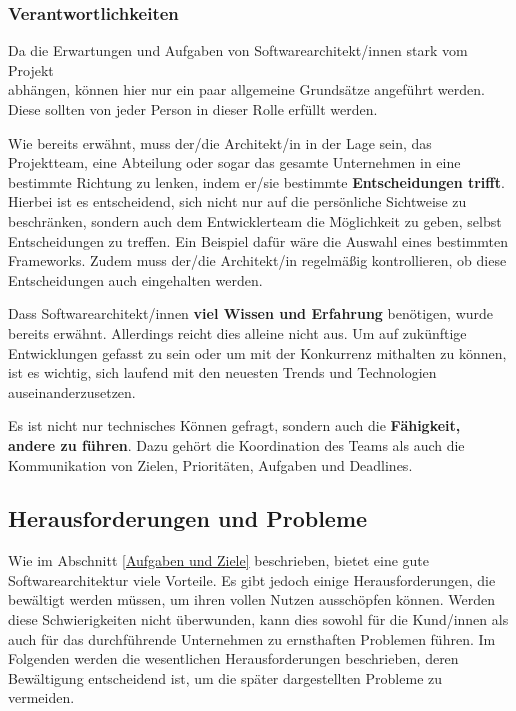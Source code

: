     \subsubsection{Verantwortlichkeiten}

    Da die Erwartungen und Aufgaben von Softwarearchitekt/innen stark vom Projekt \\ abhängen, können hier nur ein paar allgemeine Grundsätze angeführt werden. \\ Diese sollten von jeder Person in dieser Rolle erfüllt werden.

    Wie bereits erwähnt, muss der/die Architekt/in in der Lage sein, das Projektteam, eine Abteilung oder sogar das gesamte Unternehmen in eine bestimmte Richtung zu lenken, indem er/sie bestimmte \textbf{Entscheidungen trifft}. Hierbei ist es entscheidend, sich nicht nur auf die persönliche Sichtweise zu beschränken, sondern auch dem Entwicklerteam die Möglichkeit zu geben, selbst Entscheidungen zu treffen. Ein Beispiel dafür wäre die Auswahl eines bestimmten Frameworks. Zudem muss der/die Architekt/in regelmäßig kontrollieren, ob diese Entscheidungen auch eingehalten werden. 

    Dass Softwarearchitekt/innen \textbf{viel Wissen und Erfahrung} benötigen, wurde bereits erwähnt. Allerdings reicht dies alleine nicht aus. 
    Um auf zukünftige Entwicklungen gefasst zu sein oder um mit der Konkurrenz mithalten zu können, ist es wichtig, sich laufend mit den neuesten Trends und Technologien auseinanderzusetzen.

    Es ist nicht nur technisches Können gefragt, sondern auch die \textbf{Fähigkeit, andere zu führen}. Dazu gehört die Koordination des Teams als auch die Kommunikation von Zielen, Prioritäten, Aufgaben und Deadlines.
    \cite[S. 7-8]{EA:Book02} \cite{EA:Web03}



\subsection{Herausforderungen und Probleme} \label{Herausforderungen und Probleme}

Wie im Abschnitt \ref{Aufgaben und Ziele} beschrieben, bietet eine gute Softwarearchitektur viele Vorteile. Es gibt jedoch einige Herausforderungen, die bewältigt werden müssen, um ihren vollen Nutzen ausschöpfen können. 
Werden diese Schwierigkeiten nicht überwunden, kann dies sowohl für die Kund/innen als auch für das durchführende Unternehmen zu ernsthaften Problemen führen. Im Folgenden werden die wesentlichen Herausforderungen beschrieben, deren Bewältigung entscheidend ist, um die später dargestellten Probleme zu vermeiden.

